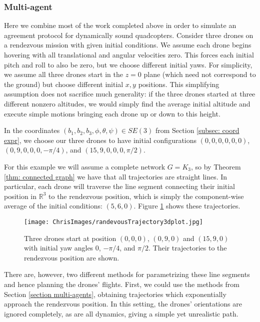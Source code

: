 \documentclass{aims}
\theoremstyle{definition}
\begin{document}
\subsubsection{Multi-agent}

Here we combine most of the work completed above in order to simulate an agreement protocol for dynamically sound quadcopters.  Consider three drones on a rendezvous mission with given initial conditions.  We assume each drone begins hovering with all translational and angular velocities zero.  This forces each initial pitch and roll to also be zero, but we choose different initial yaws.  For simplicity, we assume all three drones start in the $z=0$ plane (which need not correspond to the ground) but choose different initial $x,y$ positions.  This simplifying assumption does not sacrifice much generality: if the three drones started at three different nonzero altitudes, we would simply find the average initial altitude and execute simple motions bringing each drone up or down to this height.  

In the coordinates $(b_1, b_2, b_3, \phi, \theta, \psi) \in SE(3)$ from Section \ref{subsec: coord expr}, we choose our three drones to have initial configurations  
$(0,0,0, 0, 0, 0)$, $(0,9,0, 0, 0, -\pi/4)$, and $(15,9,0, 0, 0, \pi/2)$.

For this example we will assume a complete network $G=K_3$, so by Theorem \ref{thm: connected graph} we have that all trajectories are straight lines.  In particular, each drone will traverse the line segment connecting their initial position in $\mathbb R^3$ to the rendezvous position, which is simply the component-wise average of the initial conditions: $(5, 6, 0).$  Figure \ref{fig: rendezvous traj} shows these trajectories.

\begin{figure}
    \centering
    \texttt{[image: ChrisImages/randevousTrajectory3dplot.jpg]}
    \caption{Three drones start at position $(0,0,0)$, $(0,9,0)$ and $(15,9,0)$ with initial yaw angles $0$, $-\pi/4$, and $\pi/2$.  Their trajectories to the rendezvous position are shown.}
    \label{fig: rendezvous traj}
\end{figure}

There are, however, two different methods for parametrizing these line segments and hence planning the drones' flights.  First, we could use the methods from Section \ref{section multi-agents}, obtaining trajectories which exponentially approach the rendezvous position.  In this setting, the drones' orientations are ignored completely, as are all dynamics, giving a simple yet unrealistic path.  
\end{document}
